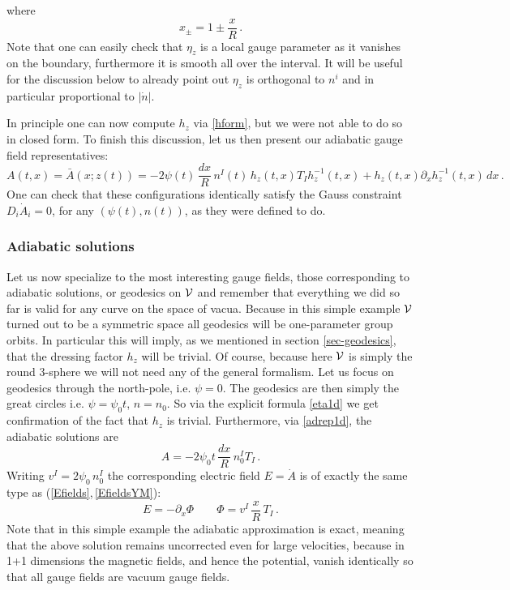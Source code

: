 \documentclass[11pt,a4paper]{article}
\def\calv{{\cal V}}
\def\pd{\partial}
\begin{document}
    where
    \begin{equation}
    x_{\pm}=1\pm \frac{x}{R}\,.
    \end{equation}
    Note that one can easily check that $\eta_z$ is a local gauge parameter as it vanishes on the boundary, furthermore it is smooth all over the interval. It will be useful for the discussion below to already point out $\eta_z$ is orthogonal to $n^i$ and in particular proportional to $|\dot n|$. 
    
    In principle one can now compute $h_z$ via \eqref{hform}, but we were not able to do so in closed form. To finish this discussion, let us then present our adiabatic gauge field representatives:
    \begin{equation}
    A(t,x)=\bar A(x;z(t))=-2\psi(t)\,\frac{dx}{R}\,n^I(t)\,h_z(t,x)T_Ih_z^{-1}(t,x)+h_z(t,x)\partial_x h_z^{-1}(t,x)\,dx\label{adrep1d}\,.
    \end{equation}
    One can check that these configurations identically satisfy the Gauss constraint $D_i\dot A_i=0$, for any $(\psi(t),n(t))$, as they were defined to do.
    
     \subsubsection{Adiabatic solutions}
    Let us now specialize to the most interesting gauge fields, those corresponding to adiabatic solutions, or geodesics on $\calv$ and remember that everything we did so far is valid for any curve on the space of vacua. Because in this simple example $\calv$ turned out to be a symmetric space all geodesics will be one-parameter group orbits. In particular this will imply, as we mentioned in section \ref{sec-geodesics}, that the dressing factor $h_z$ will be trivial. Of course, because here $\calv$ is simply the round 3-sphere we will not need any of the general formalism. Let us focus on geodesics through the north-pole, i.e. $\psi=0$. The geodesics are then simply the great circles i.e. $\psi=\psi_0t$, $n=n_0$. So via the explicit formula \eqref{eta1d} we get confirmation of the fact that $h_z$ is trivial. Furthermore, via \eqref{adrep1d}, the adiabatic solutions are
    \begin{equation}
    A=-2\psi_0t\,\frac{dx}{R}\,n_0^I T_I\,.
    \end{equation}
    Writing $v^I=2\psi_0\,n_0^I$ the corresponding electric field $E=\dot A$ is of exactly the same type as (\ref{Efields},\,\ref{EfieldsYM}):
    \begin{equation}
    E=-\pd_x\Phi\qquad \Phi=v^I\,\frac{x}{R}\,T_I\,.
    \end{equation}
    Note that in this simple example the adiabatic approximation is exact, meaning that the above solution remains uncorrected even for large velocities, because in 1+1 dimensions the magnetic fields, and hence the potential, vanish identically so that all gauge fields are vacuum gauge fields.
    
\end{document}
